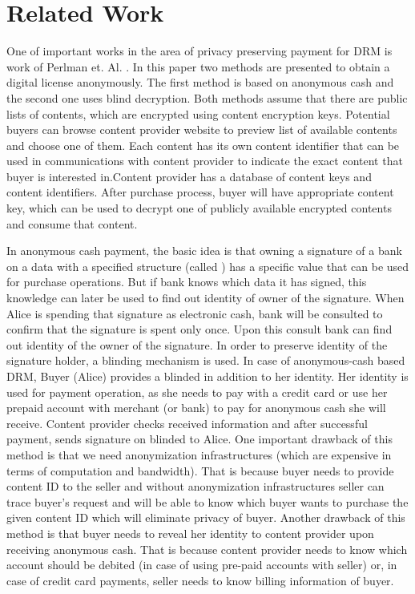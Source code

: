 \documentclass[times]{secauth}
\begin{document}
\section{Related Work}
\label{sec_related}
One of important works in the area of privacy preserving payment for DRM is work of Perlman et. Al. \cite{N28}. In this paper two methods are presented to obtain a digital license anonymously. The first method is based on anonymous cash and the second one uses blind decryption. Both methods assume that there are public lists of contents, which are encrypted using content encryption keys. Potential buyers can browse content provider website to preview list of available contents and choose one of them. Each content has its own content identifier that can be used in communications with content provider to indicate the exact content that buyer is interested in.Content provider has a database of content keys and content identifiers. After purchase process, buyer will have appropriate content key, which can be used to decrypt one of publicly available encrypted contents and consume that content. 

In anonymous cash payment, the basic idea is that owning a signature of a bank on a data with a specified structure (called ) has a specific value that can be used for purchase operations. But if bank knows which data it has signed, this knowledge can later be used to find out identity of owner of the signature. When Alice is spending that signature as electronic cash, bank will be consulted to confirm that the signature is spent only once. Upon this consult bank can find out identity of the owner of the signature. In order to preserve identity of the signature holder, a blinding mechanism is used. In case of anonymous-cash based DRM, Buyer (Alice) provides a blinded  in addition to her identity. Her identity is used for payment operation, as she needs to pay with a credit card or use her prepaid account with merchant (or bank) to pay for anonymous cash she will receive. Content provider checks received information and after successful payment, sends signature on blinded  to Alice. One important drawback of this method is that we need anonymization infrastructures (which are expensive in terms of computation and bandwidth\cite{N21}). That is because buyer needs to provide content ID to the seller and without anonymization infrastructures seller can trace buyer's request and will be able to know which buyer wants to purchase the given content ID which will eliminate privacy of buyer. Another drawback of this method is that buyer needs to reveal her identity to content provider upon receiving anonymous cash. That is because content provider needs to know which account should be debited (in case of using pre-paid accounts with seller) or, in case of credit card payments, seller needs to know billing information of buyer.
\end{document}
